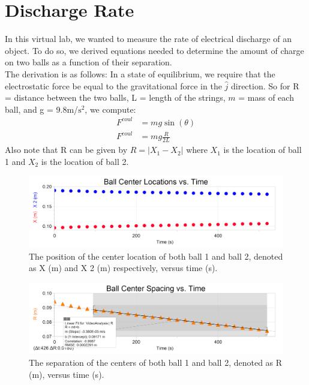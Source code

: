 \documentclass[oneside,12pt]{amsart}
\begin{document}
	\section{Discharge Rate}
	In this virtual lab, we wanted to measure the rate of electrical discharge of an object. To do so, we derived equations needed to determine the amount of charge on two balls as a function of their separation.\\
	
	The derivation is as follows: In a state of equilibrium, we require that the electrostatic force be equal to the gravitational force in the $\hat{j}$ direction. So for R = distance between the two balls, L = length of the strings, $m$ = mass of each ball, and g = 9.8m/$\text{s}^2$, we compute:
	\begin{align*}
		F^{coul} &= mg \sin(\theta)\\
		F^{coul} &= mg \frac{R}{2L}
	\end{align*}
	Also note that R can be given by $R = |X_1-X_2|$ where $X_1$ is the location of ball 1 and $X_2$ is the location of ball 2.
	 
		\begin{figure}[h]
		\includegraphics[width=\linewidth,scale=0.01]{LocvTime.png}
		\caption{The position of the center location of both ball 1 and ball 2, denoted as X (m) and X 2 (m) respectively, versus time (s).}
		\label{loc}
	\end{figure}
\begin{figure}[h]
	\includegraphics[width=\linewidth,scale=0.01]{SpacevTime.png}
	\caption{The separation of the centers of both ball 1 and ball 2, denoted as R (m), versus time (s).}
	\label{Space}
\end{figure}
\end{document}
